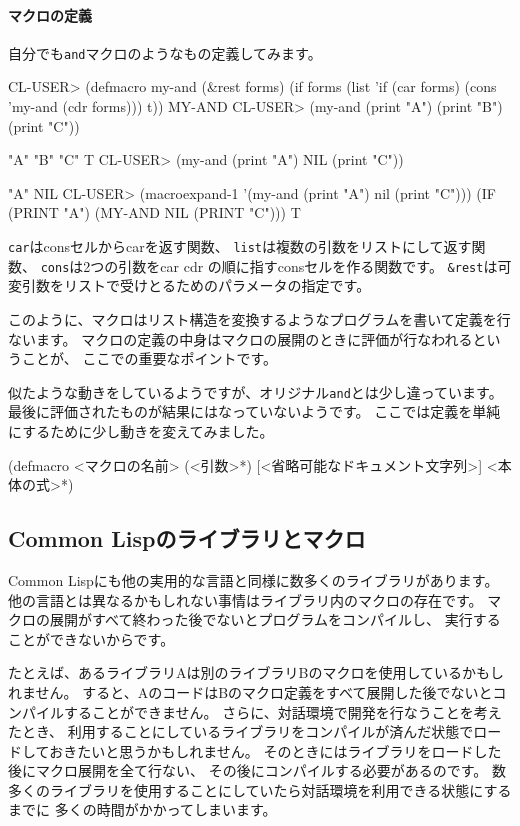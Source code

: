 \documentclass[mingoth,a4paper]{jsarticle}
\begin{document}
\paragraph{マクロの定義}

自分でも\verb|and|マクロのようなもの定義してみます。

\begin{commandline}
CL-USER> (defmacro my-and (&rest forms)
 (if forms
     (list 'if (car forms) (cons 'my-and (cdr forms)))
     t))
MY-AND
CL-USER> (my-and (print "A") (print "B") (print "C"))

"A"
"B"
"C"
T
CL-USER> (my-and (print "A") NIL (print "C"))

"A"
NIL
CL-USER> (macroexpand-1 '(my-and (print "A") nil (print "C")))
(IF (PRINT "A") (MY-AND NIL (PRINT "C")))
T
\end{commandline}

\verb|car|はconsセルからcarを返す関数、
\verb|list|は複数の引数をリストにして返す関数、
\verb|cons|は2つの引数をcar cdr の順に指すconsセルを作る関数です。
\verb|&rest|は可変引数をリストで受けとるためのパラメータの指定です。

このように、マクロはリスト構造を変換するようなプログラムを書いて定義を行ないます。
マクロの定義の中身はマクロの展開のときに評価が行なわれるということが、
ここでの重要なポイントです。

似たような動きをしているようですが、オリジナル\verb|and|とは少し違っています。
最後に評価されたものが結果にはなっていないようです。
ここでは定義を単純にするために少し動きを変えてみました。

\begin{commandline}
(defmacro <マクロの名前> (<引数>*) [<省略可能なドキュメント文字列>] <本体の式>*)
\end{commandline}


\subsection{Common Lispのライブラリとマクロ}

Common Lispにも他の実用的な言語と同様に数多くのライブラリがあります。
他の言語とは異なるかもしれない事情はライブラリ内のマクロの存在です。
マクロの展開がすべて終わった後でないとプログラムをコンパイルし、
実行することができないからです。

たとえば、あるライブラリAは別のライブラリBのマクロを使用しているかもしれません。
すると、AのコードはBのマクロ定義をすべて展開した後でないとコンパイルすることができません。
さらに、対話環境で開発を行なうことを考えたとき、
利用することにしているライブラリをコンパイルが済んだ状態でロードしておきたいと思うかもしれません。
そのときにはライブラリをロードした後にマクロ展開を全て行ない、
その後にコンパイルする必要があるのです。
数多くのライブラリを使用することにしていたら対話環境を利用できる状態にするまでに
多くの時間がかかってしまいます。
\end{document}
